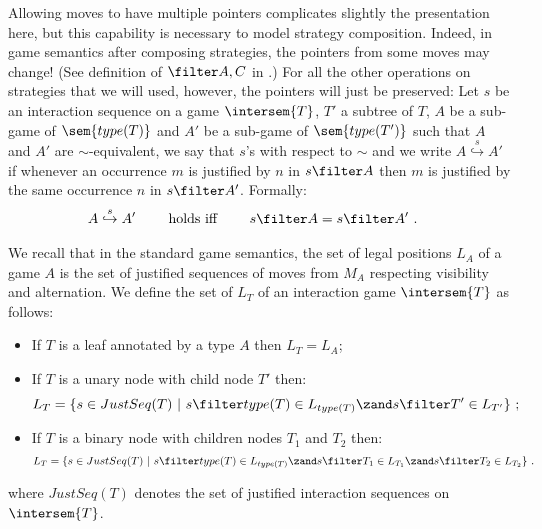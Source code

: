 Allowing moves to have multiple pointers complicates slightly the
presentation here, but this capability is necessary to model
strategy composition. Indeed, in game semantics after composing
strategies, the pointers from some moves may change! (See definition
of $\filter A,C$ in \cite{abramsky:game-semantics-tutorial}.)
For all the other operations on strategies that we will
used, however, the pointers will just be preserved:
Let $s$ be an  interaction sequence on a game
$\intersem{T}$, $T'$ a subtree of $T$, $A$ be a sub-game of
$\sem{type(T)}$ and $A'$ be a sub-game of $\sem{type(T')}$ such that $A$ and $A'$ are $\sim$-equivalent,
we say that $s$'s 
with respect to $\sim$ and we write $A\stackrel{s}\hookrightarrow A'$ if
whenever an occurrence $m$ is justified by $n$ in $s\filter A$ then $m$ is justified by the same occurrence $n$ in $s \filter A'$. Formally:
\begin{align*}
 A\stackrel{s}\hookrightarrow A' \qquad \mbox{ holds iff } \qquad  &
s\filter A = s\filter A' \ .
\end{align*}

\begin{definition} We recall
that in the standard game semantics, the set of legal positions
$L_A$ of a game $A$ is the set of justified sequences of moves from
$M_A$ respecting visibility and alternation. We define the set of
 $L_T$ of an interaction game $\intersem{T}$ as
follows:
    \begin{itemize}
    \item If $T$ is a leaf annotated by a type $A$ then $L_T =
    L_A$;
    \item If $T$ is a unary node with child node $T'$ then:
    $$L_T = \{ s \in JustSeq(T) \ | \ s \filter type(T) \in L_{type(T)} \zand  s \filter T' \in L_{T'} \} \ ;$$
    \item If $T$ is a binary node with children nodes $T_1$ and $T_2$ then:
    $$L_T = \{ s \in JustSeq(T) \ | \ s \filter type(T) \in L_{type(T)} \zand  s \filter T_1 \in L_{T_1}
    \zand  s \filter T_2 \in L_{T_2} \} \ .$$
    \end{itemize}
    where $JustSeq(T)$ denotes the set of justified interaction sequences on
    $\intersem{T}$.
\end{definition}


